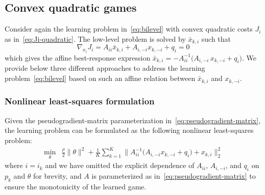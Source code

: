 \documentclass[11pt, a4paper]{article}
\theoremstyle{remark}
\theoremstyle{plain}
\begin{document}
\subsection{Convex quadratic games}
Consider again the learning problem in~\eqref{eq:bilevel} with convex quadratic costs $J_i$ as in~\eqref{eq:Ji-quadratic}. The low-level problem is solved by $ \bar x_{k,i}$ such that
\begin{equation}
    \nabla_{x_i} J_i = A_{ii} \bar x_{k,i} + A_{i,-i} x_{k,-i} + q_i = 0
\label{eq:zero-gradient}
\end{equation}
which gives the affine best-response expression $\bar x_{k,i} = -A_{ii}^{-1}\bigl( A_{i,-i}\, x_{k,-i} + q_i \bigr)$.
We provide below three different approaches to address the learning problem~\eqref{eq:bilevel} based on such an affine relation between $\bar x_{k,i}$ and $x_{k,-i}$.

\subsubsection{Nonlinear least-squares formulation}
Given the pseudogradient-matrix parameterization in~\eqref{eq:pseudogradient-matrix}, the learning problem can be formulated as the following nonlinear least-squares problem:
\begin{equation}
    \begin{aligned}
    \min_\theta &\frac{\rho}{2}\|\theta\|^2 +
        \frac{1}{K}\sum_{k=1}^{K}
        \bigl\| A_{ii}^{-1}\bigl( A_{i,-i} x_{k,-i} + q_i \bigr) + {x}_{k,i} \bigr\|_2^2
    \end{aligned}
\label{eq:nls-monotone}
\end{equation}
where $i=i_k$ and we have omitted the explicit dependence of $A_{ii}$, $A_{i,-i}$, and $q_i$ on $p_k$ and $\theta$ for brevity, and $A$ is parameterized as in~\eqref{eq:pseudogradient-matrix} to ensure the monotonicity of the learned game.
\end{document}
